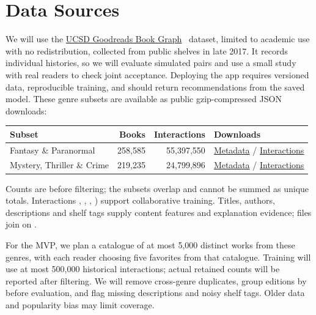 \section*{Data Sources}

We will use the \href{https://cseweb.ucsd.edu/~jmcauley/datasets/goodreads.html}{UCSD Goodreads Book Graph}~\cite{wan2018, wan2019} dataset, limited to academic use with no redistribution, collected from public shelves in late 2017. It records individual histories, so we will evaluate simulated pairs and use a small study with real readers to check joint acceptance. Deploying the app requires versioned data, reproducible training, and should return recommendations from the saved model. These genre subsets are available as public gzip-compressed JSON downloads:

\begin{center}\small 
    \begin{tabular}{@{}lrrl@{}} 
    \toprule 
    Subset & Books & Interactions & Downloads \\ 
    \midrule 
    Fantasy \& Paranormal & 258,585 & 55,397,550 & \href{https://mcauleylab.ucsd.edu/public_datasets/gdrive/goodreads/byGenre/goodreads_books_fantasy_paranormal.json.gz}{Metadata} / \href{https://mcauleylab.ucsd.edu/public_datasets/gdrive/goodreads/byGenre/goodreads_interactions_fantasy_paranormal.json.gz}{Interactions} \\ 
    Mystery, Thriller \& Crime & 219,235 & 24,799,896 & \href{https://mcauleylab.ucsd.edu/public_datasets/gdrive/goodreads/byGenre/goodreads_books_mystery_thriller_crime.json.gz}{Metadata} / \href{https://mcauleylab.ucsd.edu/public_datasets/gdrive/goodreads/byGenre/goodreads_interactions_mystery_thriller_crime.json.gz}{Interactions} \\ 
    \bottomrule 
    \end{tabular}
\end{center} 
Counts are before filtering; the subsets overlap and cannot be summed as unique totals. Interactions , , , ) support collaborative training. Titles, authors, descriptions and shelf tags supply content features and explanation evidence; files join on .\par\smallskip For the MVP, we plan a catalogue of at most 5,000 distinct works from these genres, with each reader choosing five favorites from that catalogue. Training will use at most 500,000 historical interactions; actual retained counts will be reported after filtering. We will remove cross-genre duplicates, group editions by  before evaluation, and flag missing descriptions and noisy shelf tags. Older data and popularity bias may limit coverage.\par\smallskip 